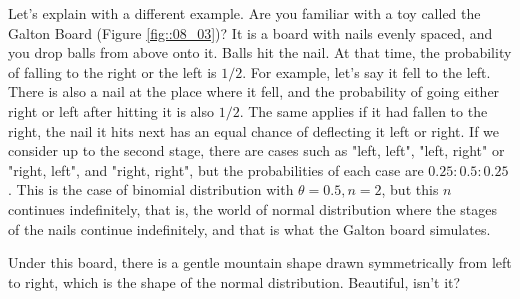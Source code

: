 \documentclass{ltjbook}
\begin{document}
Let's explain with a different example. Are you familiar with a toy called the Galton Board (Figure \ref{fig::08_03})? It is a board with nails evenly spaced, and you drop balls from above onto it.
Balls hit the nail. At that time, the probability of falling to the right or the left is $1/2$. For example, let's say it fell to the left. There is also a nail at the place where it fell, and the probability of going either right or left after hitting it is also $1/2$. The same applies if it had fallen to the right, the nail it hits next has an equal chance of deflecting it left or right. If we consider up to the second stage, there are cases such as "left, left", "left, right" or "right, left", and "right, right", but the probabilities of each case are $0.25:0.5:0.25$. This is the case of binomial distribution with $\theta=0.5,n=2$, but this $n$ continues indefinitely, that is, the world of normal distribution where the stages of the nails continue indefinitely, and that is what the Galton board simulates.



Under this board, there is a gentle mountain shape drawn symmetrically from left to right, which is the shape of the normal distribution. Beautiful, isn't it?
\end{document}
